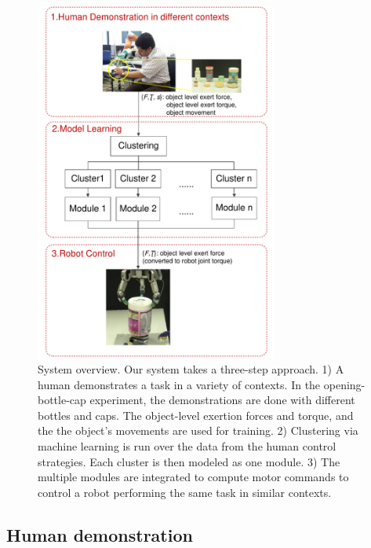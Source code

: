 \begin{figure}
  \centering
   \includegraphics[width=8cm]{./fig/overview5.pdf}
   \caption{ \scriptsize{System overview. Our system takes a
       three-step approach. 1) A human demonstrates a task in a
       variety of contexts. In the opening-bottle-cap experiment, the
       demonstrations are done with different bottles and caps. The
       object-level exertion forces and torque, and the the object's
       movements are used for training. 2) Clustering via machine
       learning is run over the data from the human control
       strategies. Each cluster is then modeled as one module. 3) The
       multiple modules are integrated to compute motor commands to
       control a robot performing the same task in similar contexts.}  }
\label{fig:overview}
\end{figure}

\subsection{Human demonstration}
\label{sec:demo}


